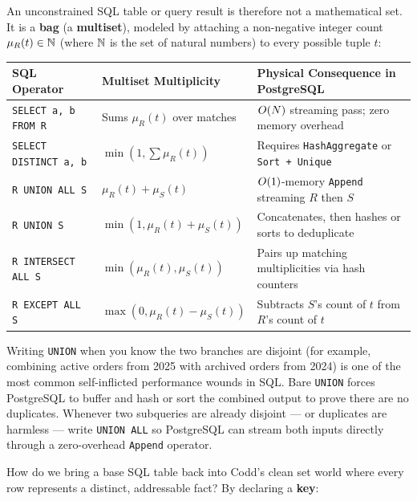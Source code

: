 An unconstrained SQL table or query result is therefore not a mathematical set. It is a \textbf{bag} (a \textbf{multiset}), modeled by attaching a non-negative integer count $\mu_R(t) \in \mathbb{N}$ (where $\mathbb{N}$ is the set of natural numbers) to every possible tuple $t$:

\begin{center}
{\small
\begin{tabular}{llp{6.1cm}}
\toprule
SQL Operator & Multiset Multiplicity & Physical Consequence in PostgreSQL \\
\midrule
\texttt{SELECT a, b FROM R} & Sums $\mu_R(t)$ over matches & $O(N)$ streaming pass; zero memory overhead \\
\texttt{SELECT DISTINCT a, b} & $\min(1, \sum \mu_R(t))$ & Requires \texttt{HashAggregate} or \texttt{Sort + Unique} \\
\texttt{R UNION ALL S} & $\mu_R(t) + \mu_S(t)$ & $O(1)$-memory \texttt{Append} streaming $R$ then $S$ \\
\texttt{R UNION S} & $\min(1, \mu_R(t) + \mu_S(t))$ & Concatenates, then hashes or sorts to deduplicate \\
\texttt{R INTERSECT ALL S} & $\min(\mu_R(t), \mu_S(t))$ & Pairs up matching multiplicities via hash counters \\
\texttt{R EXCEPT ALL S} & $\max(0, \mu_R(t) - \mu_S(t))$ & Subtracts $S$'s count of $t$ from $R$'s count of $t$ \\
\bottomrule
\end{tabular}}
\end{center}

\begin{trapbox}
Writing \texttt{UNION} when you know the two branches are disjoint (for example, combining active orders from 2025 with archived orders from 2024) is one of the most common self-inflicted performance wounds in SQL. Bare \texttt{UNION} forces PostgreSQL to buffer and hash or sort the combined output to prove there are no duplicates. Whenever two subqueries are already disjoint --- or duplicates are harmless --- write \texttt{UNION ALL} so PostgreSQL can stream both inputs directly through a zero-overhead \texttt{Append} operator.
\end{trapbox}

How do we bring a base SQL table back into Codd's clean set world where every row represents a distinct, addressable fact? By declaring a \textbf{key}:

